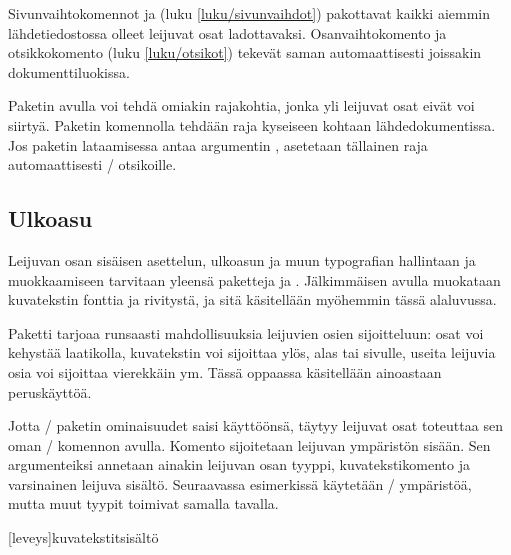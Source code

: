 \noindent
Sivunvaihtokomennot  ja 
(luku \ref{luku/sivunvaihdot}) pakottavat kaikki aiemmin
lähdetiedostossa olleet leijuvat osat ladottavaksi. Osanvaihtokomento
 ja otsikkokomento  (luku
\ref{luku/otsikot}) tekevät saman automaattisesti joissakin
dokumenttiluokissa.

Paketin  avulla voi tehdä omiakin rajakohtia,
jonka yli leijuvat osat eivät voi siirtyä. Paketin komennolla
 tehdään raja kyseiseen kohtaan lähdedokumentissa.
Jos paketin lataamisessa antaa argumentin , asetetaan
tällainen raja automaattisesti \-/ otsikoille.

\begin{koodilohkosis}
\usepackage[section]{placeins}
\end{koodilohkosis}

\subsection{Ulkoasu}
\label{luku/leijuosat-ulkoasu}

Leijuvan osan sisäisen asettelun, ulkoasun ja muun typografian
hallintaan ja muokkaamiseen tarvitaan yleensä paketteja
 ja . Jälkimmäisen avulla
muokataan kuvatekstin fonttia ja rivitystä, ja sitä käsitellään
myöhemmin tässä alaluvussa.

Paketti  tarjoaa runsaasti mahdollisuuksia leijuvien
osien sijoitteluun: osat voi kehystää laatikolla, kuvatekstin voi
sijoittaa ylös, alas tai sivulle, useita leijuvia osia voi sijoittaa
vierekkäin ym. Tässä oppaassa käsitellään ainoastaan peruskäyttöä.

Jotta \-/ paketin ominaisuudet saisi käyttöönsä,
täytyy leijuvat osat toteuttaa sen oman \-/ komennon
avulla. Komento sijoitetaan leijuvan ympäristön sisään. Sen
argumenteiksi annetaan ainakin leijuvan osan tyyppi, kuvatekstikomento
ja varsinainen leijuva sisältö. Seuraavassa esimerkissä käytetään
\-/ ympäristöä, mutta muut tyypit toimivat samalla
tavalla.

\begin{koodilohkosis}
\begin{table}
  [leveys]{kuvatekstit}{sisältö}
\end{table}
\end{koodilohkosis}

